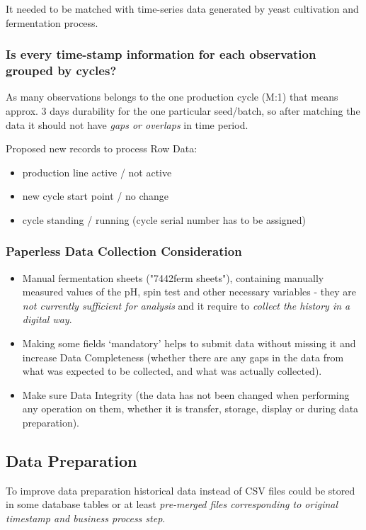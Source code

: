 It needed to be matched with time-series data generated by yeast cultivation and fermentation process.  

\subsubsection{Is every time-stamp information for each observation grouped by cycles?}

As many observations belongs to the one production cycle (M:1) that means approx. 3 days durability for the one particular seed/batch, so after matching the data it should not have \emph{gaps or overlaps} in time period.  

Proposed new records to process Row Data: 
\begin{itemize}
    \item production line active / not active
    \item new cycle start point / no change
    \item cycle standing / running (cycle serial number has to be assigned) 
\end{itemize}

\subsubsection{Paperless Data Collection Consideration}
\begin{itemize}
    \item Manual fermentation sheets ("7442ferm sheets"), containing manually measured values of the pH, spin test and other necessary variables - they are \emph{not currently sufficient for analysis} and it require to \emph{collect the history in a digital way}. 
    \item Making some fields ‘mandatory’ helps to submit data without missing it and increase Data Completeness (whether there are any gaps in the data from what was expected to be collected, and what was actually collected).
    \item Make sure Data Integrity (the data has not been changed when performing any operation on them, whether it is transfer, storage, display or during data preparation).
\end{itemize}

\subsection{Data Preparation}
To improve data preparation historical data instead of CSV files could be stored in some database tables or at least \emph{pre-merged files corresponding to original timestamp and business process step}.

